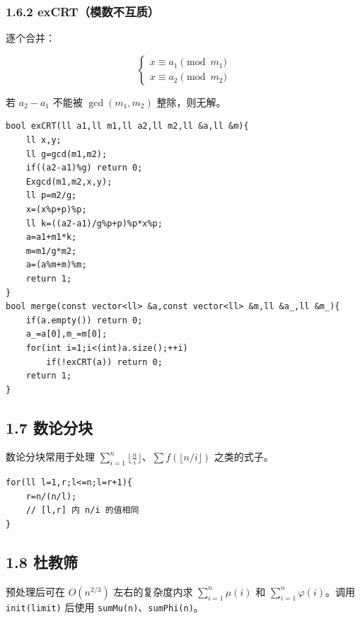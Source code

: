 \documentclass[UTF8,a4paper,11pt]{ctexart}
\begin{document}
\subsubsection*{1.6.2 exCRT（模数不互质）}

逐个合并：

\[
\begin{cases}
x\equiv a_1\pmod{m_1}\\
x\equiv a_2\pmod{m_2}
\end{cases}
\]

若 $a_2-a_1$ 不能被 $\gcd(m_1,m_2)$ 整除，则无解。

\begin{Verbatim}[fontsize=\small,frame=single,breaklines=true,breakanywhere=true]
bool exCRT(ll a1,ll m1,ll a2,ll m2,ll &a,ll &m){
    ll x,y;
    ll g=gcd(m1,m2);
    if((a2-a1)%g) return 0;
    Exgcd(m1,m2,x,y);
    ll p=m2/g;
    x=(x%p+p)%p;
    ll k=((a2-a1)/g%p+p)%p*x%p;
    a=a1+m1*k;
    m=m1/g*m2;
    a=(a%m+m)%m;
    return 1;
}
bool merge(const vector<ll> &a,const vector<ll> &m,ll &a_,ll &m_){
    if(a.empty()) return 0;
    a_=a[0],m_=m[0];
    for(int i=1;i<(int)a.size();++i)
        if(!exCRT(a)) return 0;
    return 1;
}
\end{Verbatim}

\subsection*{1.7 数论分块}

数论分块常用于处理 $\sum_{i=1}^n\lfloor\frac{n}{i}\rfloor$、$\sum f(\lfloor n/i\rfloor)$ 之类的式子。

\begin{Verbatim}[fontsize=\small,frame=single,breaklines=true,breakanywhere=true]
for(ll l=1,r;l<=n;l=r+1){
    r=n/(n/l);
    // [l,r] 内 n/i 的值相同
}
\end{Verbatim}

\subsection*{1.8 杜教筛}

预处理后可在 $O(n^{2/3})$ 左右的复杂度内求 $\sum_{i=1}^n\mu(i)$ 和 $\sum_{i=1}^n\varphi(i)$。调用 \texttt{init(limit)} 后使用 \texttt{sumMu(n)}、\texttt{sumPhi(n)}。

\end{document}
